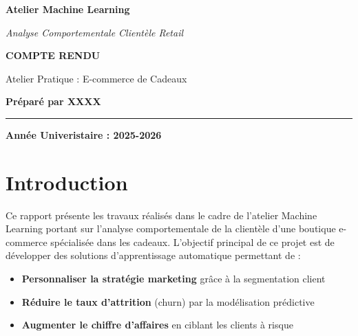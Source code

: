 \documentclass[11pt,a4paper]{article}
\begin{document}
\begin{titlepage}
\vspace{2cm}

\begin{center}
{\Huge\textbf{Atelier Machine Learning}}\par
\vspace{0.5cm}
{\Large\textit{Analyse Comportementale Clientèle Retail}}\par

\vspace{4cm}

{\LARGE\textbf{COMPTE RENDU}}\par
\vspace{1cm}
{\large Atelier Pratique : E-commerce de Cadeaux}\par
\vspace{2cm}
{\large \textbf{Préparé par XXXX}}
\vspace{3cm}

\rule{10cm}{2pt}

\vspace{5cm}

{\textbf{Année Univeristaire : 2025-2026}}

\end{center}
\vfill
\end{titlepage}

\tableofcontents
\newpage

\section{Introduction}

Ce rapport présente les travaux réalisés dans le cadre de l'atelier Machine Learning portant sur l'analyse comportementale de la clientèle d'une boutique e-commerce spécialisée dans les cadeaux. L'objectif principal de ce projet est de développer des solutions d'apprentissage automatique permettant de :

\begin{itemize}
    \item \textbf{Personnaliser la stratégie marketing} grâce à la segmentation client
    \item \textbf{Réduire le taux d'attrition} (churn) par la modélisation prédictive
    \item \textbf{Augmenter le chiffre d'affaires} en ciblant les clients à risque
\end{itemize}
\end{document}

